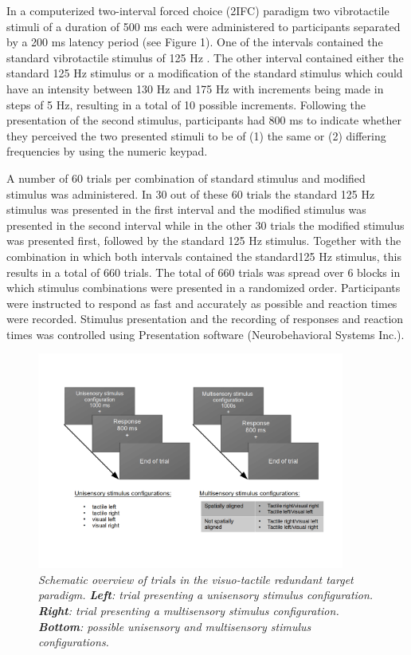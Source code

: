 \documentclass[12pt]{article}
\begin{document}
%
\par In a computerized two-interval forced choice (2IFC) paradigm two vibrotactile stimuli of a duration of 500 ms each were administered to participants separated by a 200 ms latency period (see Figure 1). One of the intervals contained the standard vibrotactile stimulus of 125 Hz \parencite[adapted from][]{auer_vibrotactile_2007}. The other interval contained either the standard 125 Hz stimulus or a modification of the standard stimulus which could have an intensity between 130 Hz and 175 Hz with increments being made in steps of 5 Hz, resulting in a total of 10 possible increments. Following the presentation of the second stimulus, participants had 800 ms to indicate whether they perceived the two presented stimuli to be of (1) the same or (2) differing frequencies by using the numeric keypad. 
%
\par A number of 60 trials per combination of standard stimulus and modified stimulus was administered. In 30 out of these 60 trials the standard 125 Hz stimulus was presented in the first interval and the modified stimulus was presented in the second interval while in the other 30 trials the modified stimulus was presented first, followed by the standard 125 Hz stimulus. Together with the combination in which both intervals contained the standard125 Hz stimulus, this results in  a total of 660 trials. The total of 660 trials was spread over 6 blocks in which stimulus combinations were presented in a randomized order. Participants were instructed to respond as fast and accurately as possible and reaction times were recorded. Stimulus presentation and the recording of responses and reaction times was controlled using Presentation software (Neurobehavioral Systems Inc.).
%
\begin{figure}[t!]
    \centering
    \includegraphics[width=0.9\textwidth]{VVTMI_overview.png}
    \caption{\textit{\footnotesize{Schematic overview of trials in the visuo-tactile redundant target paradigm. \textbf{Left}: trial presenting a unisensory stimulus configuration. \textbf{Right}: trial presenting a multisensory stimulus configuration. \textbf{Bottom}: possible unisensory and multisensory stimulus configurations.}}}
    \label{fig:VVTMI}
\end{figure}
%
\end{document}
